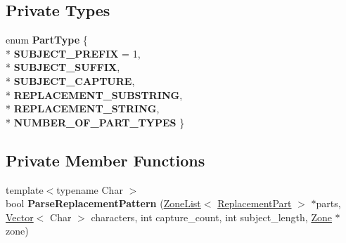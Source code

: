\subsection*{Private Types}
\begin{DoxyCompactItemize}
\item 
enum {\bfseries Part\+Type} \{ \\*
{\bfseries S\+U\+B\+J\+E\+C\+T\+\_\+\+P\+R\+E\+F\+IX} = 1, 
\\*
{\bfseries S\+U\+B\+J\+E\+C\+T\+\_\+\+S\+U\+F\+F\+IX}, 
\\*
{\bfseries S\+U\+B\+J\+E\+C\+T\+\_\+\+C\+A\+P\+T\+U\+RE}, 
\\*
{\bfseries R\+E\+P\+L\+A\+C\+E\+M\+E\+N\+T\+\_\+\+S\+U\+B\+S\+T\+R\+I\+NG}, 
\\*
{\bfseries R\+E\+P\+L\+A\+C\+E\+M\+E\+N\+T\+\_\+\+S\+T\+R\+I\+NG}, 
\\*
{\bfseries N\+U\+M\+B\+E\+R\+\_\+\+O\+F\+\_\+\+P\+A\+R\+T\+\_\+\+T\+Y\+P\+ES}
 \}\hypertarget{classv8_1_1internal_1_1_compiled_replacement_a3320ab9edc00b601a18ef03ce2e70e2f}{}\label{classv8_1_1internal_1_1_compiled_replacement_a3320ab9edc00b601a18ef03ce2e70e2f}

\end{DoxyCompactItemize}
\subsection*{Private Member Functions}
\begin{DoxyCompactItemize}
\item 
{\footnotesize template$<$typename Char $>$ }\\bool {\bfseries Parse\+Replacement\+Pattern} (\hyperlink{classv8_1_1internal_1_1_zone_list}{Zone\+List}$<$ \hyperlink{structv8_1_1internal_1_1_compiled_replacement_1_1_replacement_part}{Replacement\+Part} $>$ $\ast$parts, \hyperlink{classv8_1_1internal_1_1_vector}{Vector}$<$ Char $>$ characters, int capture\+\_\+count, int subject\+\_\+length, \hyperlink{classv8_1_1internal_1_1_zone}{Zone} $\ast$zone)\hypertarget{classv8_1_1internal_1_1_compiled_replacement_abbccfef0f9810fe8d65086e472e1649f}{}\label{classv8_1_1internal_1_1_compiled_replacement_abbccfef0f9810fe8d65086e472e1649f}

\end{DoxyCompactItemize}
